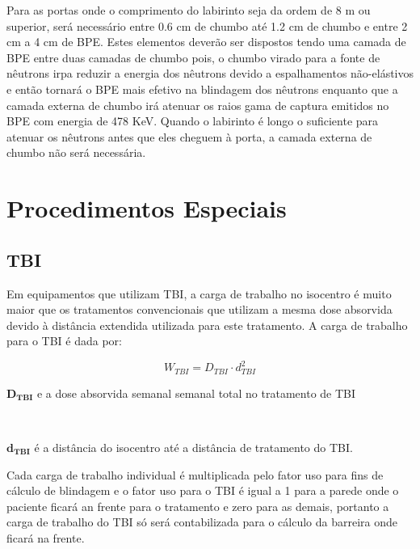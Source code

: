 \documentclass[11pt,a4paper]{article}
\newcounter{exemplo}
\begin{document}
        Para as portas onde o comprimento do labirinto seja da ordem de 8 m ou superior, será necessário entre 0.6 cm de chumbo até 1.2 cm de chumbo e entre 2 cm a 4 cm de BPE. Estes elementos deverão ser dispostos tendo uma camada de BPE entre duas camadas de chumbo pois, o chumbo virado para a fonte de nêutrons irpa reduzir a energia dos nêutrons devido a espalhamentos não-elástivos e então tornará o BPE mais efetivo na blindagem dos nêutrons enquanto que a camada externa de chumbo irá atenuar os raios gama de captura emitidos no BPE com energia de 478 KeV. Quando o labirinto é longo o suficiente para atenuar os nêutrons antes que eles cheguem à porta, a camada externa de chumbo não será necessária.

    \section{Procedimentos Especiais}

    \subsection{TBI}

    Em equipamentos que utilizam TBI, a carga de trabalho no isocentro é muito maior que os tratamentos convencionais que utilizam a mesma dose absorvida devido à distância extendida utilizada para este tratamento. A carga de trabalho para o TBI é dada por:
                
    \begin{equation}
        W_{TBI} = D_{TBI} \cdot d_{TBI}^2
    \end{equation}

    \begin{exemplo}[onde:]
        \textcolor{CarnationPink}{$\mathbf{D_{TBI}}$} e a dose absorvida semanal semanal total no tratamento de TBI
        
        \

        \textcolor{CarnationPink}{$\mathbf{d_{TBI}}$} é a distância do isocentro até a distância de tratamento do TBI.
    \end{exemplo}

    Cada carga de trabalho individual é multiplicada pelo fator uso para fins de cálculo de blindagem e o fator uso para o TBI é igual a 1 para a parede onde o paciente ficará an frente para o tratamento e zero para as demais, portanto a carga de trabalho do TBI só será contabilizada para o cálculo da barreira onde ficará na frente. 
\end{document}
